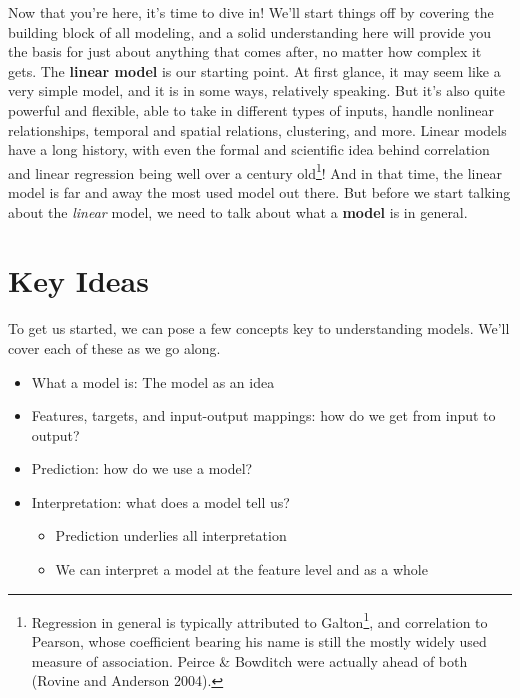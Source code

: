 \documentclass[
  letterpaper,
]{krantz}
\providecommand{\tightlist}{%
  \setlength{\itemsep}{0pt}\setlength{\parskip}{0pt}}\usepackage{longtable,booktabs,array}
\DeclareRobustCommand{\href}[2]{#2\footnote{\url{#1}}}
\begin{document}
Now that you're here, it's time to dive in! We'll start things off by
covering the building block of all modeling, and a solid understanding
here will provide you the basis for just about anything that comes
after, no matter how complex it gets. The \textbf{linear model} is our
starting point. At first glance, it may seem like a very simple model,
and it is in some ways, relatively speaking. But it's also quite
powerful and flexible, able to take in different types of inputs, handle
nonlinear relationships, temporal and spatial relations, clustering, and
more. Linear models have a long history, with even the formal and
scientific idea behind correlation and linear regression being well over
a century old\footnote{Regression in general is typically attributed to
  \href{https://en.wikipedia.org/wiki/Francis_Galton}{Galton}, and
  correlation to Pearson, whose coefficient bearing his name is still
  the mostly widely used measure of association. Peirce \& Bowditch were
  actually ahead of both (Rovine and Anderson 2004).}! And in that time,
the linear model is far and away the most used model out there. But
before we start talking about the \emph{linear} model, we need to talk
about what a \textbf{model} is in general.

\section{Key Ideas}\label{sec-lm-key-ideas}

To get us started, we can pose a few concepts key to understanding
models. We'll cover each of these as we go along.

\begin{itemize}
\tightlist
\item
  What a model is: The model as an idea
\item
  Features, targets, and input-output mappings: how do we get from input
  to output?
\item
  Prediction: how do we use a model?
\item
  Interpretation: what does a model tell us?

  \begin{itemize}
  \tightlist
  \item
    Prediction underlies all interpretation
  \item
    We can interpret a model at the feature level and as a whole
  \end{itemize}
\end{itemize}
\end{document}
